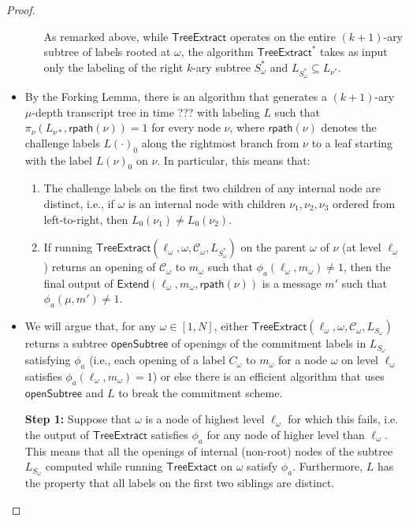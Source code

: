 \begin{proof}
\begin{itemize}
\begin{itemize}
As remarked above, while $\textsf{TreeExtract}$ operates on the entire $(k+1)$-ary subtree of labels rooted at $\omega$, the algorithm $\textsf{TreeExtract}^*$ takes as input only the labeling of the right $k$-ary subtree $S^*_\omega$ and $L_{S^*_\omega} \subseteq L_{\nu^*}$. 

\end{itemize}

\item By the Forking Lemma, there is an algorithm that generates a $(k+1)$-ary $\mu$-depth transcript tree in time ??? with labeling $L$ such that $\pi_\nu(L_{\nu*}, \textsf{rpath}(\nu)) = 1$ for every node $\nu$, where $\textsf{rpath}(\nu)$ denotes the challenge labels $L(\cdot)_0$ along the rightmost branch from $\nu$ to a leaf starting with the label $L(\nu)_0$ on $\nu$. In particular, this means that: 
\begin{enumerate}
\item The challenge labels on the first two children of any internal node are distinct, i.e., if $\omega$ is an internal node with children $\nu_1, \nu_2, \nu_3$ ordered from left-to-right, then $L_0(\nu_1) \neq L_0(\nu_2)$. 
\item  If running $\textsf{TreeExtract}(\ell_\omega, \omega, \mathcal{C}_\omega, L_{S^*_\omega})$ on the parent $\omega$ of $\nu$ (at level $\ell_\omega$) returns an opening of $\mathcal{C}_\omega$ to $m_\omega$ such that $\phi_a(\ell_\omega, m_\omega) \neq 1$, then the final output of $\textsf{Extend}(\ell_\omega, m_\omega, \textsf{rpath}(\nu))$ is a message $m'$ such that $\phi_a(\mu, m') \neq 1$. 
\end{enumerate} 

\item We will argue that,  for any $\omega \in [1,N]$, either $\textsf{TreeExtract}(\ell_\omega, \omega, \mathcal{C}_\omega, L_{S_\omega})$ returns a subtree $\textsf{openSubtree}$ of openings of the commitment labels in $L_{S_\omega}$ satisfying $\phi_a$ (i.e., each opening of a label $C_\omega$ to $m_\omega$ for a node $\omega$ on level $\ell_\omega$ satisfies $\phi_a(\ell_\omega, m_\omega) = 1$) or else there is an efficient algorithm that uses $\textsf{openSubtree}$ and $L$ to break the commitment scheme. 

\textbf{Step 1:} Suppose that $\omega$ is a node of highest level $\ell_{\omega}$ for which this fails, i.e. the output of $\textsf{TreeExtract}$ satisfies $\phi_a$ for any node of higher level than $\ell_\omega$. 
This means that all the openings of internal (non-root) nodes of the subtree $L_{S_\omega}$ computed while running $\textsf{TreeExtact}$ on $\omega$ satisfy $\phi_a$. Furthermore, $L$ has the property that all labels on the first two siblings are distinct. 


\end{itemize}
\end{proof}
